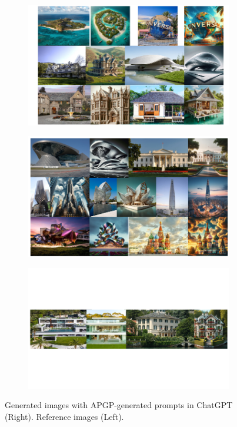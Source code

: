\begin{figure}[ht]
    \centering
    \begin{subfigure}[t]{0.85\linewidth}
        \includegraphics[width=0.99\textwidth]{figure_folder/12.png}
    \end{subfigure}
    \hfill
    \begin{subfigure}[t]{0.85\linewidth}
        \includegraphics[width=0.99\textwidth]{figure_folder/13.png}
    \end{subfigure}
    \begin{subfigure}[t]{0.85\linewidth}
        \includegraphics[width=0.99\textwidth]{figure_folder/14.png}
  
    \end{subfigure}
    \caption{Generated images with APGP-generated prompts in ChatGPT (Right). Reference images (Left).}
    \label{app:generated_results}
\end{figure}

